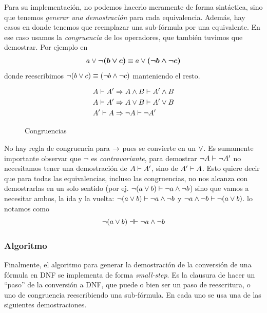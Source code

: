 Para su implementación, no podemos hacerlo meramente de forma sintáctica, sino
que tenemos \textit{generar una demostración} para cada equivalencia. Además,
hay casos en donde tenemos que reemplazar una sub-fórmula por una equivalente.
En ese caso usamos la \textit{congruencia} de los operadores, que también
tuvimos que demostrar. Por ejemplo en
\[
    a \vee \bm{\neg (b \vee c)}
    \equiv
    a \vee \bm{(\neg b \wedge \neg c)}
\]
donde reescribimos $\neg
(b \vee
c) \equiv (\neg b \wedge \neg c)$ manteniendo el
resto.

\begin{figure}[H]
    \begin{align*}
        A \vdash A'
            &\Rightarrow A \wedge B \vdash A' \wedge B\\
        A \vdash A'
            &\Rightarrow A \vee B \vdash A' \vee B\\
        A' \vdash A
            &\Rightarrow \neg A \vdash \neg A'
    \end{align*}
    \caption{Congruencias}
\end{figure}

No hay regla de congruencia para $\to$ pues se convierte en un $\vee$. Es
sumamente importante observar que $\neg$ es \textit{contravariante}, para
demostrar $\neg A \vdash \neg A'$ no necesitamos tener una demostración
de $A \vdash A'$, sino de $A' \vdash A$. Esto quiere decir que
para todas las equivalencias, incluso las congruencias, no nos alcanza con
demostrarlas en un solo sentido (por ej. $\neg(a \vee b) \vdash
\neg a \wedge \neg b$) sino que vamos a necesitar ambos, la
ida y la vuelta:
\(
    \neg(a \vee b)
        \vdash \neg a \wedge \neg b
\) y \(
    \neg a \wedge \neg b \vdash \neg(a \vee b)
\). lo notamos como \[
    \neg(a \vee b)
        \dashv\vdash \neg a \wedge \neg b
\]

\subsubsection{Algoritmo}

Finalmente, el algoritmo para generar la demostración de la conversión de una
fórmula en DNF se implementa de forma \textit{small-step}. Es la clausura de
hacer un ``paso'' de la conversión a DNF, que puede o bien ser un paso de
reescritura, o uno de congruencia reescribiendo una sub-fórmula. En cada uno se
usa una de las siguientes demostraciones.

